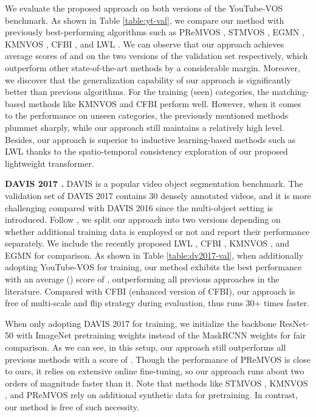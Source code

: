 \documentclass[10pt,twocolumn,letterpaper]{article}
\begin{document}
We evaluate the proposed approach on both versions of the YouTube-VOS benchmark. As shown in Table \ref{table:yt-val}, we compare our method with previously best-performing algorithms such as PReMVOS \cite{premvos2018A}, STMVOS \cite{Seoung2019A}, EGMN \cite{lu2020A}, KMNVOS \cite{Seong2020A}, CFBI \cite{CFBI2020A}, and LWL \cite{Goutam2020A}. We can observe that our approach achieves average scores of  and  on the two versions of the validation set respectively, which outperform other state-of-the-art methods by a considerable margin. Moreover, we discover that the generalization capability of our approach is significantly better than previous algorithms. For the training (seen) categories, the matching-based methods like KMNVOS \cite{Seong2020A} and CFBI \cite{CFBI2020A} perform well. However, when it comes to the performance on unseen categories, the previously mentioned methods plummet sharply, while our approach still maintains a relatively high level. Besides, our approach is superior to inductive learning-based methods such as LWL \cite{Goutam2020A} thanks to the spatio-temporal consistency exploration of our proposed lightweight transformer.


\noindent\textbf{DAVIS 2017 \cite{DAVIS2017}.}
DAVIS is a popular video object segmentation benchmark. The validation set of DAVIS 2017 contains 30 densely annotated videos, and it is more challenging compared with DAVIS 2016 \cite{DAVIS2016} since the multi-object setting is introduced. Follow \cite{Goutam2020A}, we split our approach into two versions depending on whether additional training data is employed or not and report their performance separately. We include the recently proposed LWL \cite{Goutam2020A}, CFBI \cite{CFBI2020A}, KMNVOS \cite{Seong2020A}, and EGMN \cite{lu2020A} for comparison. As shown in Table \ref{table:dv2017-val}, when additionally adopting YouTube-VOS for training, our method exhibits the best performance with an average () score of , outperforming all previous approaches in the literature. Compared with CFBI \cite{CFBI2020A} (enhanced version of CFBI), our approach is free of multi-scale and flip strategy during evaluation, thus runs 30+ times faster.



When only adopting DAVIS 2017 for training, we initialize the backbone ResNet-50 with ImageNet \cite{imagenet2009A} pretraining weights instead of the MaskRCNN \cite{maskrcnn2017A} weights for fair comparison. As we can see, in this setup, our approach still outperforms all previous methods with a  score of .
Though the performance of PReMVOS \cite{premvos2018A} is close to ours, it relies on extensive online fine-tuning, so our approach runs about two orders of magnitude faster than it.
Note that methods like STMVOS \cite{Seoung2019A}, KMNVOS \cite{Seong2020A}, and PReMVOS \cite{premvos2018A} rely on additional synthetic data for pretraining. In contrast, our method is free of such necessity. 
\end{document}
